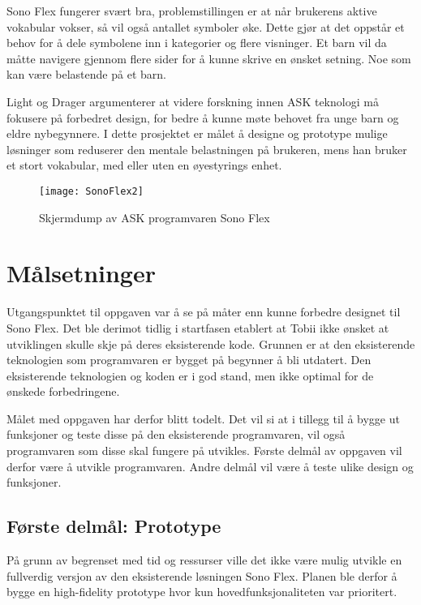 Sono Flex fungerer svært bra, problemstillingen er at når brukerens aktive vokabular vokser, så vil også antallet symboler øke. Dette gjør at det oppstår et behov for å dele symbolene inn i kategorier og flere visninger. Et barn vil da måtte navigere gjennom flere sider for å kunne skrive en ønsket setning. Noe som kan være belastende på et barn.

Light og Drager \cite{aac} argumenterer at videre forskning innen ASK teknologi må fokusere på forbedret design, for bedre å kunne møte behovet fra unge barn og eldre nybegynnere. I dette prosjektet er målet å designe og prototype mulige løsninger som reduserer den mentale belastningen på brukeren, mens han bruker et stort vokabular, med eller uten en øyestyrings enhet. 

\begin{figure}[ht!]
\centering
\texttt{[image: SonoFlex2]}
\caption{Skjermdump av ASK programvaren Sono Flex}
\label{fig:SonoFlex}
\end{figure}


\section{Målsetninger}

Utgangspunktet til oppgaven var å se på måter enn kunne forbedre designet til Sono Flex. Det ble derimot tidlig i startfasen etablert at Tobii ikke ønsket at utviklingen skulle skje på deres eksisterende kode. Grunnen er at den eksisterende teknologien som programvaren er bygget på begynner å bli utdatert. Den eksisterende teknologien og koden er i god stand, men ikke optimal for de ønskede forbedringene. 

Målet med oppgaven har derfor blitt todelt. Det vil si at i tillegg til å bygge ut funksjoner og teste disse på den eksisterende programvaren, vil også programvaren som disse skal fungere på utvikles. Første delmål av oppgaven vil derfor være å utvikle programvaren. Andre delmål vil være å teste ulike design og funksjoner.

\subsection{Første delmål: Prototype}

På grunn av begrenset med tid og ressurser ville det ikke være mulig  utvikle en fullverdig versjon av den eksisterende løsningen Sono Flex. Planen ble derfor å bygge en high-fidelity prototype hvor kun hovedfunksjonaliteten var prioritert.  


